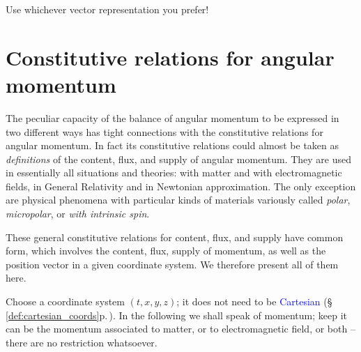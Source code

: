 \documentclass[a4paper,12pt,%
onecolumn,oneside,%
british%
]{memoir}
\renewcommand*{\|}[1][]{\nonscript\:#1\vert\nonscript\:\mathopen{}}
\newcommand*{\sect}{\S}%
\renewcommand*{\autoref}[3][\sect\,\ref]{\textcolor{blue}{#3} {\color{blue}\scriptsize(\faIcon[regular]{eye}\;#1{#2}\;p.\,\pageref{#2})}}
\begin{document}
Use whichever vector representation you prefer! %


\section{Constitutive relations for angular momentum}
\label{sec:constitutive_angmomentum_standard}

The peculiar capacity of the balance of angular momentum to be expressed in two different ways has tight connections with the constitutive relations for angular momentum. In fact its constitutive relations could almost be taken as \emph{definitions} of the content, flux, and supply of angular momentum. They are used in essentially all situations and theories: with matter and with electromagnetic fields, in General Relativity and in Newtonian approximation. The only exception are physical phenomena with particular kinds of materials variously called \emph{polar}, \emph{micropolar}, or \emph{with intrinsic spin}.

These general constitutive relations for content, flux, and supply have common form, which involves the content, flux, supply of momentum, as well as the position vector in a given coordinate system. We therefore present all of them here.

Choose a coordinate system $(t,x,y,z)$; it does not need to be \autoref{def:cartesian_coords}{Cartesian}. In the following we shall speak of momentum; keep it can be the momentum associated to matter, or to electromagnetic field, or both -- there are no restriction whatsoever.

\medskip
\end{document}
